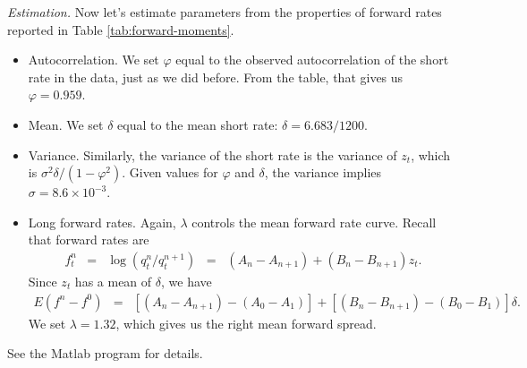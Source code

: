 \documentclass[11pt]{article}
\begin{document}
\begin{comment}
\begin{table}[h]
\centering
\caption{Properties of forward rates}
\begin{tabular}{lrrr}
\toprule
Forward rate $f^n_t$    &  Mean  &  Std Dev  &  Autocorr \\
\midrule
$f^0_t$                 &  6.683 & 2.703     &  0.959   \\
$f^{12}_t$              &  7.921 & 2.495     &  0.969   \\
$f^{120}_t$             &  8.858 & 1.946     &  0.980   \\
\bottomrule
\end{tabular}
\label{tab:forward-moments}
\end{table}
\end{comment}

{\it Estimation.\/}
Now let's estimate parameters from the properties of forward rates
reported in Table \ref{tab:forward-moments}.
%
\begin{itemize}
\item Autocorrelation.
We set $\varphi$ equal to the observed autocorrelation of the short rate in the data,
just as we did before.
From the table, that gives us $\varphi = 0.959$.

\item Mean.  We set $\delta$ equal to the mean short rate:
$\delta = 6.683/1200$.

\item Variance.  Similarly, the variance of the short rate is the variance of $z_t$,
which is $ \sigma^2 \delta/(1-\varphi^2)$.
Given values for $\varphi$ and $\delta$,
the variance implies $\sigma = 8.6\times 10^{-3}$.

\item Long forward rates.  Again,
$\lambda$ controls the mean forward rate curve.
Recall that forward rates are
\begin{eqnarray*}
    f^n_t &=& \log (q^n_t/q^{n+1}_t)
                \;\;=\;\;  (A_n - A_{n+1}) + (B_n - B_{n+1}) z_t .
\end{eqnarray*}
Since $z_t$ has a  mean of $\delta$,  we have
\begin{eqnarray*}
    E (f^n - f^0) &=&  [(A_n - A_{n+1}) - (A_0 - A_{1})] +
        [(B_n - B_{n+1}) - (B_0 - B_{1})] \delta.
\end{eqnarray*}
We set $\lambda=1.32$, which gives us the right mean forward spread.

\end{itemize}
See the Matlab program for details.
\end{document}
